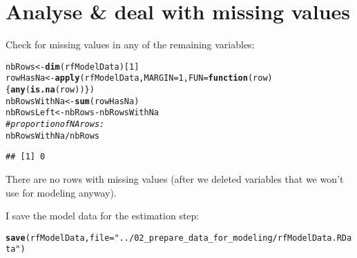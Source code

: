 \documentclass{article}\usepackage[]{graphicx}\usepackage[]{color}
\makeatletter
\newcommand{\hlnum}[1]{\textcolor[rgb]{0.686,0.059,0.569}{#1}}%
\newcommand{\hlstr}[1]{\textcolor[rgb]{0.192,0.494,0.8}{#1}}%
\newcommand{\hlcom}[1]{\textcolor[rgb]{0.678,0.584,0.686}{\textit{#1}}}%
\newcommand{\hlopt}[1]{\textcolor[rgb]{0,0,0}{#1}}%
\newcommand{\hlstd}[1]{\textcolor[rgb]{0.345,0.345,0.345}{#1}}%
\newcommand{\hlkwa}[1]{\textcolor[rgb]{0.161,0.373,0.58}{\textbf{#1}}}%
\newcommand{\hlkwb}[1]{\textcolor[rgb]{0.69,0.353,0.396}{#1}}%
\newcommand{\hlkwc}[1]{\textcolor[rgb]{0.333,0.667,0.333}{#1}}%
\newcommand{\hlkwd}[1]{\textcolor[rgb]{0.737,0.353,0.396}{\textbf{#1}}}%
\newenvironment{kframe}{%
 \def\at@end@of@kframe{}%
 \ifinner\ifhmode%
  \def\at@end@of@kframe{\end{minipage}}%
  \begin{minipage}{\columnwidth}%
 \fi\fi%
 \def\FrameCommand##1{\hskip\@totalleftmargin \hskip-\fboxsep
 \colorbox{shadecolor}{##1}\hskip-\fboxsep
     \hskip-\linewidth \hskip-\@totalleftmargin \hskip\columnwidth}%
 \MakeFramed {\advance\hsize-\width
   \@totalleftmargin\z@ \linewidth\hsize
   \@setminipage}}%
 {\par\unskip\endMakeFramed%
 \at@end@of@kframe}
\newenvironment{knitrout}{}{} %
\makeatother
\begin{document}
\section{Analyse \& deal with missing values}

Check for missing values in any of the remaining variables:
\begin{knitrout}
\color{fgcolor}\begin{kframe}
\begin{alltt}
\hlstd{nbRows} \hlkwb{<-} \hlkwd{dim}\hlstd{(rfModelData)[}\hlnum{1}\hlstd{]}
\hlstd{rowHasNa} \hlkwb{<-} \hlkwd{apply}\hlstd{(rfModelData,} \hlkwc{MARGIN}\hlstd{=}\hlnum{1}\hlstd{,} \hlkwc{FUN}\hlstd{=}\hlkwa{function}\hlstd{(}\hlkwc{row}\hlstd{)\{} \hlkwd{any}\hlstd{(}\hlkwd{is.na}\hlstd{(row)) \})}
\hlstd{nbRowsWithNa} \hlkwb{<-} \hlkwd{sum}\hlstd{(rowHasNa)}
\hlstd{nbRowsLeft} \hlkwb{<-} \hlstd{nbRows} \hlopt{-} \hlstd{nbRowsWithNa}
\hlcom{# proportion of NA rows:}
\hlstd{nbRowsWithNa} \hlopt{/} \hlstd{nbRows}
\end{alltt}
\begin{verbatim}
## [1] 0
\end{verbatim}
\end{kframe}
\end{knitrout}

There are no rows with missing values (after we deleted variables that we won't use for modeling anyway).

I save the model data for the estimation step:
\begin{knitrout}
\color{fgcolor}\begin{kframe}
\begin{alltt}
\hlkwd{save}\hlstd{(rfModelData,} \hlkwc{file}\hlstd{=}\hlstr{"../02_prepare_data_for_modeling/rfModelData.RData"}\hlstd{)}
\end{alltt}
\end{kframe}
\end{knitrout}
\end{document}
